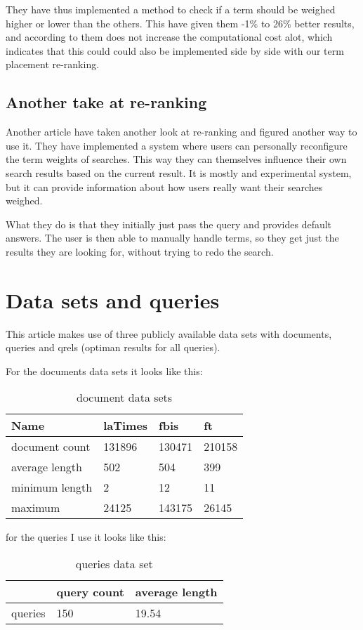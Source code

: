 \documentclass{sig-alternate}
\begin{document}
They have thus implemented a method to check if a term should be weighed higher or lower than the others. This have given them -1\% to 26\% better results, and according to them does not increase the computational cost alot, which indicates that this could could also be implemented side by side with our term placement re-ranking.

\subsection{Another take at re-ranking}
Another article\cite{review2} have taken another look at re-ranking and figured another way to use it. They have implemented a system where users can personally reconfigure the term weights of searches. This way they can themselves influence their own search results based on the current result. It is mostly and experimental system, but it can provide information about how users really want their searches weighed. 

What they do is that they initially just pass the query and provides default answers. The user is then able to manually handle terms, so they get just the results they are looking for, without trying to redo the search.

 \section{Data sets and queries}
This article makes use of three publicly available data sets with documents, queries and qrels (optiman results for all queries). 

For the documents data sets it looks like this:
\begin{table}[h!]
\centering
\caption{document data sets}
\begin{tabular}{|l|l|l|l|}
\hline
Name           & laTimes & fbis   & ft     \\ \hline
document count & 131896  & 130471 & 210158 \\ \hline
average length & 502     & 504    & 399    \\ \hline
minimum length & 2       & 12     & 11     \\ \hline
maximum        & 24125   & 143175 & 26145  \\ \hline
\end{tabular}
\end{table}

for the queries I use it looks like this:

\begin{table}[h!]
\centering
\caption{queries data set}
\begin{tabular}{|l|l|l|}
\hline
 & query count & average length  \\ \hline
queries & 150 & 19.54     \\ \hline
\end{tabular}
\end{table}
\end{document}
